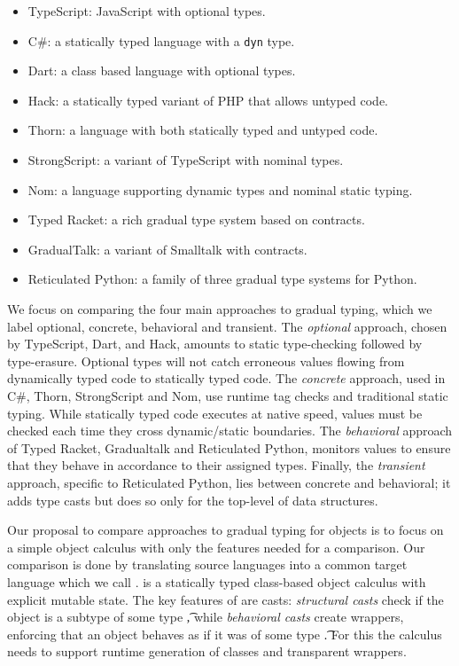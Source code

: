 \documentclass[a4paper,USenglish]{tex/lipics-v2016}
\begin{document}
\begin{itemize}
 \item TypeScript: JavaScript with optional types.
 \item C\#: a statically typed language with a {\tt dyn} type.
 \item Dart: a class based language with optional types.
 \item Hack: a statically typed variant of PHP that allows untyped code.
 \item Thorn: a language with both statically typed and untyped code.
 \item StrongScript: a variant of TypeScript with nominal types.
 \item Nom: a language supporting dynamic types and nominal static typing.
 \item Typed Racket: a rich gradual type system based on contracts.
 \item GradualTalk: a variant of Smalltalk with contracts.
\item Reticulated Python: a family of three gradual type systems for Python.
\end{itemize}

\noindent We focus on comparing the four main approaches to gradual typing,
which we label optional, concrete, behavioral and transient. The
\emph{optional} approach, chosen by TypeScript, Dart, and Hack, amounts to
static type-checking followed by type-erasure. Optional types will not catch
erroneous values flowing from dynamically typed code to statically typed code.
The \emph{concrete} approach, used in C\#, Thorn, StrongScript and Nom, use
runtime tag checks and traditional static typing. While statically typed code
executes at native speed, values must be checked each time they cross
dynamic/static boundaries. The \emph{behavioral} approach of Typed Racket,
Gradualtalk and Reticulated Python, monitors values to ensure that they behave
in accordance to their assigned types.  Finally, the \emph{transient}
approach, specific to Reticulated Python, lies between concrete and
behavioral; it adds type casts but does so only for the top-level of data
structures.

Our proposal to compare approaches to gradual typing for objects is to focus
on a simple object calculus with only the features needed for a comparison.
Our comparison is done by translating source languages into a common target
language which we call \kafka.  \kafka is a statically typed class-based
object calculus with explicit mutable state. The key features of \kafka are
casts: \emph{structural casts} check if the object is a subtype of some type
\t, while \emph{behavioral casts} create wrappers, enforcing that an object
behaves as if it was of some type \t. For this the calculus needs to support
runtime generation of classes and transparent wrappers.
\end{document}
